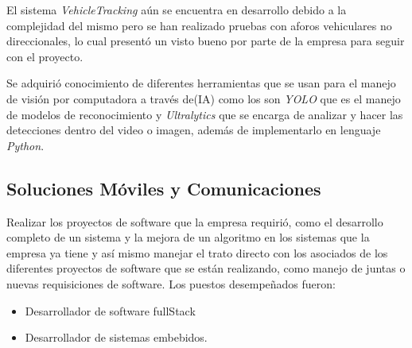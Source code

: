 \documentclass[protocolo.tex]{subfiles}
\begin{document}
\begin{enumerate}
El sistema \textit{VehicleTracking} aún se encuentra en desarrollo debido a la complejidad del mismo pero se han realizado pruebas con aforos vehiculares no direccionales, lo cual presentó un visto bueno por parte de la empresa para seguir con el proyecto.


Se adquirió conocimiento de diferentes herramientas que se usan para el manejo de visión por computadora a través de(IA) como los son \textit{YOLO} que es el manejo de modelos de reconocimiento y \textit{Ultralytics} que se encarga de analizar y hacer las detecciones dentro del video o imagen, además de implementarlo en lenguaje \textit{Python}.\vspace{5mm} 
\end{enumerate}




\subsection{Soluciones Móviles y Comunicaciones}

Realizar los proyectos de software que la empresa requirió, como el desarrollo completo de un
sistema y la mejora de un algoritmo en los sistemas que la empresa ya tiene y así mismo
manejar el trato directo con los asociados de los diferentes proyectos de software que se
están realizando, como manejo de juntas o nuevas requisiciones de software.
Los puestos desempeñados fueron:

\begin{itemize}
\item Desarrollador de software fullStack
\item Desarrollador de sistemas embebidos.
\end{itemize}
\end{document}
